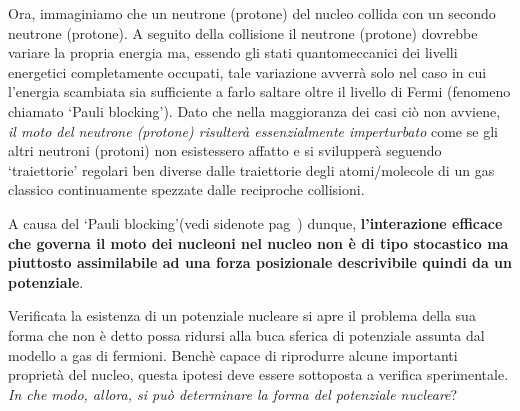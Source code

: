 Ora, immaginiamo che un neutrone (protone) del nucleo collida con un secondo neutrone (protone).
A seguito della collisione il neutrone (protone) dovrebbe variare la propria energia ma, essendo gli stati quantomeccanici dei livelli energetici completamente occupati, tale variazione avverrà solo nel caso in cui l’energia scambiata sia sufficiente a farlo saltare oltre il livello di Fermi (fenomeno chiamato ‘Pauli blocking’).
Dato che nella maggioranza dei casi ciò non avviene, \emph{il moto del neutrone (protone) risulterà essenzialmente imperturbato} come se gli altri neutroni (protoni) non esistessero affatto e si svilupperà seguendo ‘traiettorie’ regolari ben diverse dalle traiettorie degli atomi/molecole di un gas classico continuamente spezzate dalle reciproche collisioni.

A causa del `Pauli blocking’(vedi sidenote pag~\pageref{siden:pauli-blocking}) dunque, \textbf{l’interazione efficace che governa il moto dei nucleoni nel nucleo non è di tipo stocastico ma piuttosto assimilabile ad una forza posizionale descrivibile quindi da un potenziale}.
\bigskip

Verificata la esistenza di un potenziale nucleare si apre il problema della sua forma che non è detto possa ridursi alla buca sferica di potenziale assunta dal modello a gas di fermioni.
Benchè capace di riprodurre alcune importanti proprietà del nucleo, questa ipotesi deve essere sottoposta a verifica sperimentale. \emph{In che modo, allora, si può determinare la forma del potenziale nucleare}?

